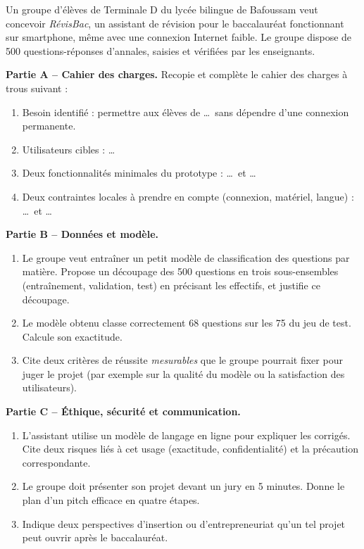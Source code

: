 \documentclass[11pt]{article}
\begin{document}
\begin{exercice}
Un groupe d'élèves de Terminale D du lycée bilingue de Bafoussam veut concevoir \emph{RévisBac}, un assistant de révision pour le baccalauréat fonctionnant sur smartphone, même avec une connexion Internet faible. Le groupe dispose de 500 questions-réponses d'annales, saisies et vérifiées par les enseignants.

\textbf{Partie A -- Cahier des charges.} Recopie et complète le cahier des charges à trous suivant :
\begin{enumerate}
\item Besoin identifié : permettre aux élèves de \ldots\ sans dépendre d'une connexion permanente.
\item Utilisateurs cibles : \ldots
\item Deux fonctionnalités minimales du prototype : \ldots\ et \ldots
\item Deux contraintes locales à prendre en compte (connexion, matériel, langue) : \ldots\ et \ldots
\end{enumerate}

\textbf{Partie B -- Données et modèle.}
\begin{enumerate}
\item Le groupe veut entraîner un petit modèle de classification des questions par matière. Propose un découpage des 500 questions en trois sous-ensembles (entraînement, validation, test) en précisant les effectifs, et justifie ce découpage.
\item Le modèle obtenu classe correctement 68 questions sur les 75 du jeu de test. Calcule son exactitude.
\item Cite deux critères de réussite \emph{mesurables} que le groupe pourrait fixer pour juger le projet (par exemple sur la qualité du modèle ou la satisfaction des utilisateurs).
\end{enumerate}

\textbf{Partie C -- Éthique, sécurité et communication.}
\begin{enumerate}
\item L'assistant utilise un modèle de langage en ligne pour expliquer les corrigés. Cite deux risques liés à cet usage (exactitude, confidentialité) et la précaution correspondante.
\item Le groupe doit présenter son projet devant un jury en 5 minutes. Donne le plan d'un pitch efficace en quatre étapes.
\item Indique deux perspectives d'insertion ou d'entrepreneuriat qu'un tel projet peut ouvrir après le baccalauréat.
\end{enumerate}
\end{exercice}
\end{document}
